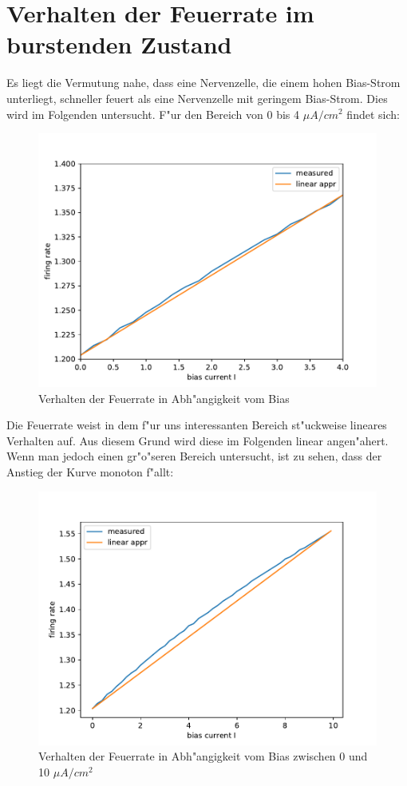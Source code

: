 \documentclass[12pt,a4paper]{article}
\begin{document}

\thispagestyle{empty}
\newpage
\tableofcontents
\thispagestyle{empty}
\newpage
{}

\section{Verhalten der Feuerrate im burstenden Zustand}
Es liegt die Vermutung nahe, dass eine Nervenzelle, die einem hohen Bias-Strom unterliegt, schneller feuert als eine Nervenzelle mit geringem Bias-Strom. Dies wird im Folgenden untersucht. F"ur den Bereich von 0 bis 4 $\mu A/cm^2$ findet sich:
\begin{figure}[H]
	\centering
	\includegraphics[scale=0.9]{detmocount04.pdf} 
	\caption{Verhalten der Feuerrate in Abh"angigkeit vom Bias}
	\label{count04}
\end{figure}
Die Feuerrate weist in dem f"ur uns interessanten Bereich st"uckweise lineares Verhalten auf. Aus diesem Grund wird diese im Folgenden linear angen"ahert.
\newpage
Wenn man jedoch einen gr"o"seren Bereich untersucht, ist zu sehen, dass der Anstieg der Kurve monoton f"allt:
\begin{figure}[H]
	\centering
	\includegraphics[scale=0.9]{detmocount.pdf} 
	\caption{Verhalten der Feuerrate in Abh"angigkeit vom Bias zwischen 0 und 10 $\mu A/cm^2$}
	\label{count}
\end{figure}
\end{document}
